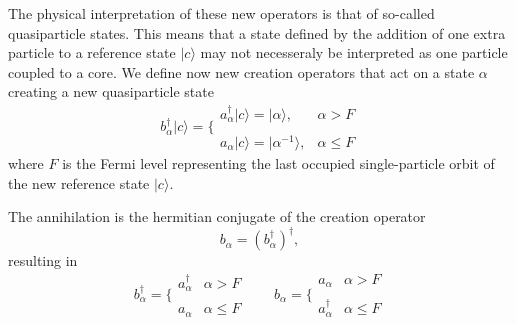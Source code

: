 \documentclass[graybox,sectrefs,envcountresetchap,open=right]{svmonodo}
\begin{document}
The physical interpretation of these new operators is that of so-called quasiparticle states.
This means that a state defined by the addition of one extra particle to a reference state $|c\rangle $ may not necesseraly be interpreted as one particle coupled to a core.
We define now new creation operators that act on a state $\alpha$ creating a new quasiparticle state
\begin{equation}
	b_\alpha^\dagger|c\rangle  = \Bigg\{ \begin{array}{ll}
		a_\alpha^\dagger |c\rangle  = |\alpha\rangle, & \alpha > F \\
		\\
		a_\alpha |c\rangle  = |\alpha^{-1}\rangle, & \alpha \leq F
	\end{array} \label{eq:2-52}
\end{equation}
where $F$ is the Fermi level representing the last  occupied single-particle orbit 
of the new reference state $|c\rangle $. 


The annihilation is the hermitian conjugate of the creation operator
\[
	b_\alpha = (b_\alpha^\dagger)^\dagger,
\]
resulting in
\begin{equation}
	b_\alpha^\dagger = \Bigg\{ \begin{array}{ll}
		a_\alpha^\dagger & \alpha > F \\
		\\
		a_\alpha & \alpha \leq F
	\end{array} \qquad 
	b_\alpha = \Bigg\{ \begin{array}{ll}
		a_\alpha & \alpha > F \\
		\\
		 a_\alpha^\dagger & \alpha \leq F
	\end{array} \label{eq:2-54}
\end{equation}
\end{document}
